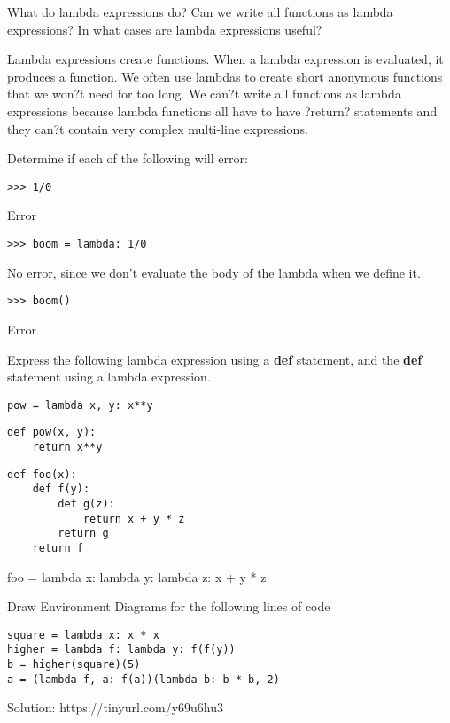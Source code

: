 \question
What do lambda expressions do? Can we write all functions as lambda expressions? In what cases are lambda expressions useful? 
\begin{solution}[0.75in]
Lambda expressions create functions. When a lambda expression is evaluated, it produces a function. We often use lambdas to create short anonymous functions that we won?t need for too long. \newline We can?t write all functions as lambda expressions because lambda functions all have to have ?return? statements and they can?t contain very complex multi-line expressions.
\end{solution}

\question
Determine if each of the following will error: \newline
\begin{lstlisting}
>>> 1/0
\end{lstlisting}
\begin{solution}[0.25in]
Error
\end{solution}
\begin{lstlisting}
>>> boom = lambda: 1/0
\end{lstlisting}
\begin{solution}[0.25in]
No error, since we don't evaluate the body of the lambda when we define it.
\end{solution}
\begin{lstlisting}
>>> boom()
\end{lstlisting}
\begin{solution}[0.25in]
Error
\end{solution}


\question
Express the following lambda expression using a \textbf{def} statement, and the \textbf{def} statement using a lambda expression.
\begin{lstlisting}
pow = lambda x, y: x**y
\end{lstlisting}
\begin{solution}[0.5in]
\begin{verbatim}
def pow(x, y):
    return x**y
\end{verbatim}
\end{solution}

\begin{lstlisting}
def foo(x):
    def f(y):
        def g(z):
            return x + y * z
        return g
    return f
\end{lstlisting}
\begin{solution}[0.25in]
foo = lambda x: lambda y: lambda z: x + y * z
\end{solution}
\newpage
\question 
Draw Environment Diagrams for the following lines of code
\begin{lstlisting}
square = lambda x: x * x
higher = lambda f: lambda y: f(f(y))
b = higher(square)(5)
a = (lambda f, a: f(a))(lambda b: b * b, 2)
\end{lstlisting}
\begin{solution}
Solution: https://tinyurl.com/y69u6hu3
\end{solution}
